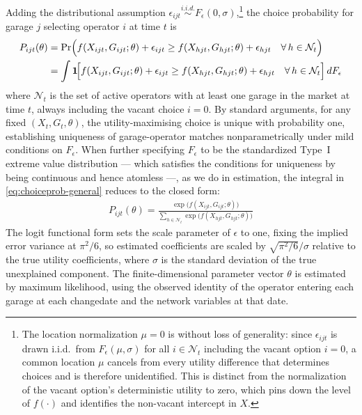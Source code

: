 \documentclass[12pt]{article}
\begin{document}
Adding the distributional assumption $\epsilon_{ijt} \overset{i.i.d.}{\sim} 
F_{\epsilon}(0,\sigma)$,\footnote{The location normalization $\mu = 0$ is without 
loss of generality: since $\epsilon_{ijt}$ is drawn i.i.d.\ from 
$F_{\epsilon}(\mu,\sigma)$ for all $i \in \mathcal{N}_t$ including the vacant 
option $i=0$, a common location $\mu$ cancels from every utility difference that 
determines choices and is therefore unidentified. This is distinct from the normalization 
of the vacant option's deterministic utility to zero, which pins down the level of 
$f(\cdot)$ and identifies the non-vacant intercept in $X$.} the choice 
probability for garage $j$ selecting operator $i$ at time $t$ is
%
\begin{align}\label{eq:choiceprob-general}
P_{ijt}(\theta) 
&= \Pr\!\Big(f(X_{ijt},G_{ijt};\theta) + \epsilon_{ijt} 
  \geq f(X_{hjt},G_{hjt};\theta) + \epsilon_{hjt} 
  \quad \forall\, h \in \mathcal{N}_t\Big) \\
&= \int \mathbf{1}\!\Big[f(X_{ijt},G_{ijt};\theta) + \epsilon_{ijt} 
  \geq f(X_{hjt},G_{hjt};\theta) + \epsilon_{hjt} 
  \quad \forall\, h \in \mathcal{N}_t\Big]\, dF_{\epsilon} \notag
\end{align}
where $\mathcal{N}_t$ is the set of active operators with at least one garage in the 
market at time $t$, always including the vacant choice $i=0$. By standard arguments, for any fixed $(X_t, G_t, \theta)$, the utility-maximising 
choice is unique with probability one, %
establishing uniqueness of garage-operator matches nonparametrically under mild conditions on $F_{\epsilon}$. When further specifying $F_{\epsilon}$ to be the standardized Type~I extreme value distribution --- which satisfies the conditions for uniqueness by being continuous 
and hence atomless ---, as we do in estimation, the integral in \eqref{eq:choiceprob-general} reduces to the 
\citet{mcfadden1984econometric} closed form:
\begin{align}\label{eq:entryprob}
P_{ijt}(\theta) = \frac{\exp\!\Big(f(X_{ijt},G_{ijt};\theta)\Big)}
{\sum_{h \in \mathcal{N}_t} \exp\!\Big(f(X_{hjt},G_{hjt};\theta)\Big)}
\end{align}
The logit functional form 
sets the scale parameter of $\epsilon$ to one, fixing the implied error variance 
at $\pi^2/6$, so estimated coefficients are scaled by $\sqrt{\pi^2/6}/\sigma$ relative 
to the true utility coefficients, where $\sigma$ is the standard deviation of the true 
unexplained component. The finite-dimensional parameter vector $\theta$ is estimated by 
maximum likelihood, using the observed identity of the operator entering each garage at 
each changedate and the network variables at that date.
\end{document}
